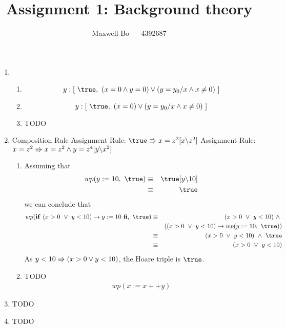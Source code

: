 \documentclass{article}
\title{\bf Assignment 1: Background theory}
\author{Maxwell Bo  ~~ 4392687}
\begin{document}
\maketitle

\begin{enumerate}
    \item 
        \begin{enumerate}
            \item \[ y: [\ \true,\ (x = 0 \land y = 0) \lor (y = y_0 / x \land x \neq 0)\ ]\]
            \item \[ y: [\ \true,\ (x = 0) \lor (y = y_0 / x \land x \neq 0)\ ]\]
            \item TODO
        \end{enumerate}
    \item 
        \DERIVE
         {Composition Rule}
         {Assignment Rule: $\true \entails x = z^2 [x \backslash z^2]$}
         {Assignment Rule: $x = z^2 \Rrightarrow x = z^2 \land y = z ^ 4[y \backslash x^2]$}
        \ENDDERIVE
    \begin{enumerate}
        \item Assuming that
            \begin{eqnarray*}
                wp(y := 10,\ \true) & \equiv & \true[y \backslash 10]\\
                                   & \equiv & \true
            \end{eqnarray*} 
                we can conclude that 
            \begin{eqnarray*}
                wp(\If~ (x > 0 ~\lor~ y < 10) \rightarrow y:= 10 ~\Fi,\ \true) & \equiv & (x > 0 ~\lor~ y < 10) ~\land~ \\
                    & & ((x > 0 ~\lor~ y < 10) \rightarrow wp(y := 10,\ \true))\\
                & \equiv & (x > 0 ~\lor~ y < 10) ~\land~ \true\\
                & \equiv & (x > 0 ~\lor~ y < 10)
            \end{eqnarray*}
            As $y < 10 \Rrightarrow (x > 0 \lor y < 10)$, the Hoare triple is $\true$.
        \item TODO
            \begin{eqnarray*}
                wp(x := x ++y)
            \end{eqnarray*}
    \end{enumerate}
    \item TODO
    \item TODO
\end{enumerate}
\end{document}

